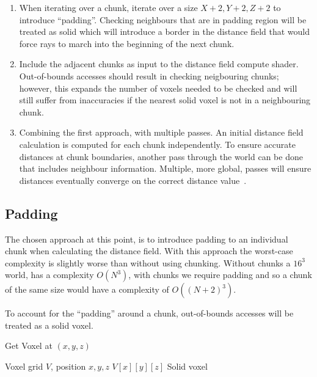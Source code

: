 \begin{enumerate}
    \item When iterating over a chunk, iterate over a size \(X + 2, Y + 2, Z + 2\) to introduce ``padding''. Checking
          neighbours that are in padding region will be treated as solid which will introduce a border in the distance field
          that would force rays to march into the beginning of the next chunk.
    \item Include the adjacent chunks as input to the distance field compute shader. Out-of-bounds accesses should
          result in checking neigbouring chunks; however, this expands the number of voxels needed to be checked and will
          still suffer from inaccuracies if the nearest solid voxel is not in a neighbouring chunk.
    \item Combining the first approach, with multiple passes. An initial distance field calculation is computed for each
          chunk independently. To ensure accurate distances at chunk boundaries, another pass through the world can be done
          that includes neighbour information. Multiple, more global, passes will ensure distances eventually converge on the
          correct distance value~\cite{gorobets2023approach,sinharoy1993finding,xu2015fast}.
\end{enumerate}

\subsection{Padding}
The chosen approach at this point, is to introduce padding to an individual chunk when calculating the distance field.
With this approach the worst-case complexity is slightly worse than without using chunking. Without chunks a \(16^3\)
world, has a complexity \(O(N^3)\), with chunks we require padding and so a chunk of the same size would have a
complexity of \(O((N + 2)^3)\).

To account for the ``padding'' around a chunk, out-of-bounds accesses will be treated as a solid voxel.

\begin{algorithm}[H]
    \caption{Get Voxel at \((x, y, z)\)}
    \label{alg:get_voxel}
    \begin{algorithmic}[1]
        \REQUIRE Voxel grid \(V\), position \(x, y, z\)
        \RETURN \(V[x][y][z]\)
        \ELSE
        \RETURN Solid voxel
        \ENDIF
    \end{algorithmic}
\end{algorithm}

